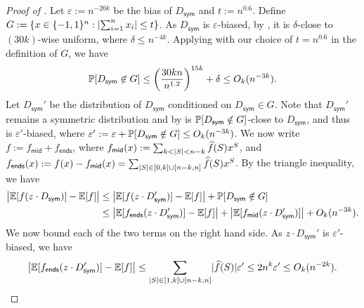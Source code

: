 \documentclass[10pt,a4paper]{article}
\theoremstyle{definition}
\renewcommand{\Pr}{\mathop{\mathbb{P}\/}}
\newcommand{\E}{\mathop{\mathbb{E}\/}}
\newcommand{\eps}{\epsilon}
\newcommand{\wh}[1]{\widehat{#1}}
\newcommand{\pmo}{\{-1,1\}}
\newcommand{\hf}{\wh{f}}
\DeclarePairedDelimiter\abs{\lvert}{\rvert}
\def\sym{\mathsf{sym}}
\def\ends{\mathsf{ends}}
\def\middle{\mathsf{mid}}
\def\epsilon{\varepsilon}
\begin{document}
\begin{proof}[Proof of ]
  Let $\eps := n^{-20k}$ be the bias of $D_\sym$ and $t := n^{0.6}$.
  Define $G := \{ x \in \pmo^n: \abs{\sum_{i=1}^n x_i} \le t \}$.
  As $D_\sym$ is $\eps$-biased, by , it is $\delta$-close to $(30k)$-wise uniform, where $\delta \le n^{-4k}$.
  Applying  with our choice of $t = n^{0.6}$ in the definition of $G$, we have
  \begin{align}  \label{eq:shifted-sym-bias-sp-tail}
    \Pr[ D_\sym \not\in G ]
    \le \left( \frac{ 30kn }{n^{1.2}} \right)^{15k} + \delta
    \le O_k(n^{-3k}) .
  \end{align}
  Let $D_\sym'$ be the distribution of $D_\sym$ conditioned on $D_\sym \in G$.
  Note that $D_\sym'$ remains a symmetric distribution and by  is $\Pr[D_\sym \notin G]$-close to $D_\sym$, and thus is $\eps'$-biased, where $\eps' := \eps + \Pr[D_\sym \notin G] \le O_k(n^{-3k})$.
  We now write $f := f_{\middle} + f_{\ends}$, where $f_{\middle}(x) := \sum_{k <  \abs{S} < n-k} \hf(S) x^S$, and $f_\ends(x) := f(x) - f_{\middle}(x) = \sum_{\abs{S} \in [0,k] \cup [n-k,n]} \hf(S) x^S$.
  By the triangle inequality, we have 
  \begin{align}
    \abs[\big]{\E[f(z \cdot D_\sym)] - \E[f]}
    &\le \abs[\big]{\E[f(z \cdot D_\sym')] - \E[f]} + \Pr[D_\sym \notin G] \nonumber \\
    &\le \abs[\big]{\E[f_\ends(z \cdot D_\sym')] - \E[f]} + \abs[\big]{\E[f_\middle(z \cdot D_\sym')]} + O_k(n^{-3k}) . \label{eq:shifted-sym-bias-sp-cases}
  \end{align}
  We now bound each of the two terms on the right hand side.
  As $z \cdot D_\sym'$ is $\eps'$-biased, we have
  \begin{align} \label{eq:shifted-sym-bias-sp-ends}
    \abs[\big]{ \E[f_{\ends}(z \cdot D_\sym')] - \E[f] }
    \le \sum_{\abs{S} \in [1,k] \cup [n-k,n]} \abs{\hf(S)} \eps'
    \le 2 n^k \eps'
    \le O_k(n^{-2k}) .
  \end{align}
  

\end{proof}
\end{document}

